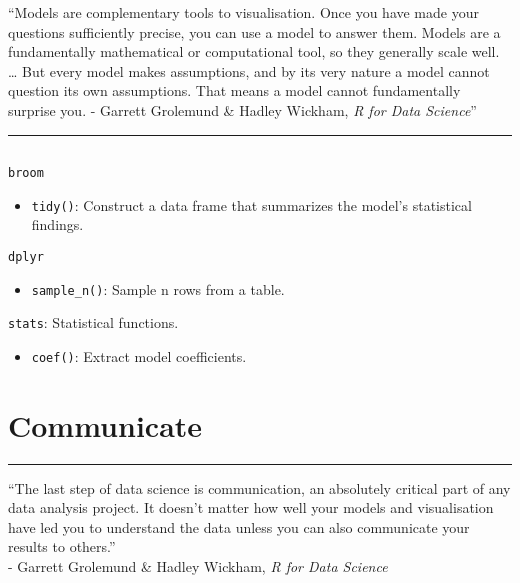 \documentclass[]{book}
\providecommand{\tightlist}{%
  \setlength{\itemsep}{0pt}\setlength{\parskip}{0pt}}
\theoremstyle{definition}
\theoremstyle{definition}
\theoremstyle{definition}
\theoremstyle{remark}
\begin{document}
``Models are complementary tools to visualisation. Once you have made
your questions sufficiently precise, you can use a model to answer them.
Models are a fundamentally mathematical or computational tool, so they
generally scale well. \ldots{} But every model makes assumptions, and by
its very nature a model cannot question its own assumptions. That means
a model cannot fundamentally surprise you. - Garrett Grolemund \& Hadley
Wickham, \emph{R for Data Science}''

\begin{center}\rule{0.5\linewidth}{\linethickness}\end{center}

\section{}\label{section}

\texttt{broom}

\begin{itemize}
\tightlist
\item
  \texttt{tidy()}: Construct a data frame that summarizes the model's
  statistical findings.
\end{itemize}

\texttt{dplyr}

\begin{itemize}
\tightlist
\item
  \texttt{sample\_n()}: Sample n rows from a table.
\end{itemize}

\texttt{stats}: Statistical functions.

\begin{itemize}
\tightlist
\item
  \texttt{coef()}: Extract model coefficients.
\end{itemize}

\chapter{Communicate}\label{communicate}

\begin{center}\rule{0.5\linewidth}{\linethickness}\end{center}

``The last step of data science is communication, an absolutely critical
part of any data analysis project. It doesn't matter how well your
models and visualisation have led you to understand the data unless you
can also communicate your results to others.''\\
- Garrett Grolemund \& Hadley Wickham, \emph{R for Data Science}
\end{document}
